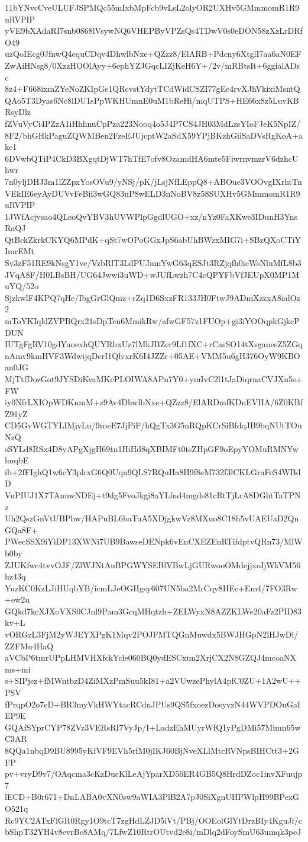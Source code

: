 11bYNvcCveULUFJSPMQc55mIxbMpFcb9vLsL2olyOR2UXHv5GMmmomR1R9uRVPIP
yVE9bXAdaRI7snb0868lVsywNQ6VHEPByVPZsQs4TDwV0s0eDON58zXzLrDRfO49
uzQoIEcg0JfnwQ4equCDqv4DhwlbNxe+QZzz8/ElARB+Pdcny6XtglI7aa6aN0EF
ZwAiHNsg8/0XzzHOOlAyy+6ephYZJGqcLIZjKeH6Y+/2v/mRBtsIt+6ggialADsc
8z4+F668ixmZYeNoZKIpGe1QRcvstYdytTCdWidCSZI77gEe4rvXJhVkixiMsntQ
QAo5T3Dyas6Nc8lDU1sPpWKHUmnE0uM1bReHi/mqUTPS+HE66x8z5LuvKBRsyDlz
fZVuVyCi4PZzA1iHhhnuCpPza223Nooq4o5J4P7CS4JH03MdLzsYIoFJeK5NpIZ/
8F2/bhGHkPaguZQWMBen2FzeEJUjcptW2aSdX59YPjBKzhGiiSaDVsRgKoA+akc1
6DVwbQTiP4CkD3BXgqtDjWT7hTfE7ofv8OzamdHA6mte5FiwrnvmzrV6dzhcUhwr
7n0yljDHJ3m1lZZpxYosOVu9/yNSj/pK/jLsjNfLEppQ8+ABOue3VOOvgIXrhtTn
VEkIE6eyAyDUVvFeBii3wGQ83uP8wELD3nNoBV8z58SUXHv5GMmmomR1R9uRVPIP
1JWfAcjysao4QLeoQvYBV3hUVWPlpGgdlUGO+xz/nYz0FaXKwe3IDunH3YnsRaQJ
QtBckZkrkCKYQ6MPdK+qSt7wOPoGGxJpS6abUhBWzxMIG7i+SBzQXoCTiYImrEMt
Sv3zF51RE9kNsgY1ve/VzbRlT3LdPUJmnYwG63qESJt3RZjqfh0icWsNluMfL8b3
JVqA8F/H0LBsBH/UG64Jwwi3uWD+wJUfLwzh7C4cQPYFbVfJEUpX0MP1MuYQ/52o
SjzkwlF4KPQ7qHc/IbgGrGlQmz+rZq1D6SxzFR133JH0FtwJ9ADmXzzxA8ialOz2
mToYKIqldZVPBQrx21sDpTen6MmikRw/afwGF57z1FUOp+gi3iYOOqpkGjkcPDUN
IUTgFgRV10gdYuoexhQUYRhxUz7lMkJBZer9Lf1fXC+rCasSO14tXsganesZ5ZGq
nAmv9kmHVF3WdwijqDcrI1QlvxrK6I4JZZr+05AE+VMM5u6gH376OyW9KBOan0JG
MjTtfDozGot9JYSDiKvaMKcPLOIWA8APn7Y0+ymIvC2l1tJaDiqruaCVJXn5s+FW
iy0NfrLXIOpWDKnmM+z9Av4DhwlbNxe+QZzz8/ElARDmfKDnEVHA/6Z0KBfZ91yZ
CD5GvWGTYLIMjvLu/9roeE7JjPiF/hQgTx3G5nRQpKCrSiBfdqJB9bqNUtTOuNzQ
sSYLd8RSx4D8yAPgXjgH69tn1HiHd8qXBIMFt0tsZHpGF9oEpyYOMuRMNYwhnqbE
ib+2fFIghQ1w6cY3plrxG6Q0Uqn9QLS7RQuHa8H9f8eM732f3lCKLGraFeS4WBdD
VuPIUJ1X7TAnnwNDEj+t9dg5FvoJkgi8aYLfnd4mgds81cRtTjLrA8DGhtTaTPNz
Uh2QszGnVtUBPbw/HAPuBL6baTuA5XDjgkwVz8MXuo8C18h5vUAEUaD2QnGQa8F+
PWecSSX9iYiDP13XWNi7UB9BawseDENpk6vEnCXEZEnRTifdptvQRn73/MlWb0by
ZJUKfwc4tvvOJF/ZlWJNtAuBPGWYSEBlVBwLjGURwooOMdejjxoIjWkVM56hz43q
YuzKC0KzLJiHUqbYB/icmLJeOGHgsy607UN5ba2MrCqy8HEc+Em4/7FO3Rw+ew2u
GQkd7kcXJXoVXS0CJnl9Pam3GcqMHqtzh+ZELWyxN8AZZKLWe20aFz2PID83kv+L
vORGzL3FjM2yWJEYXPgK1Mqv2POJFMTQGnMuwdx5BWJHGpN2lHJwDi/ZZFMu4HaQ
aVCbP6tmrUPpLHMVHXfckYcle060BQ0ydESCxun2XrjCX2N8GZQJ4mcoaNXms+mi
s+SIPjez+fMWntbzD4ZiMXzPmSuu5kI81+a2VUwzePhylA4pfC0ZU+1A2wU++PSV
fPrqpO2o7eD+BR3myVkHWYtacRCdnJPUs9QS5fxoezDosyvzN44WVPDOuGaIEP9E
GQAfSYprCYP78ZVz3VERsRI7VyJp/I+LadzEhMUyrWfQ1yPgDMi57Mimn65wC3AR
8QQa1nbqD9BU8995yKfVF9EVh5rfM0jIKJ60BjNveXLlMtcRVNpsBIHCtt3+2GFP
pv+vryD9v7/OAqcma3cKzDucKlLeAjYparXD56ER4GB5Q8HrdDZoc1invXFuujp7
lECD+B0r671+DnLABA0vXN0sw9aWIA3PlB2A7pJ0SiXgnUHPWlpH99BPexGO521q
Rc9YC2ATxFlGR0Rgy1O9tcT7zgHdLZJD5iVt/PBj/OOEolGlYtDrzBIy4KguJf/c
bShpT32YH4v8evrBc8AMq/7LfwZ10RtrOUtvd2e8i/mDlq2dFoySmU63umqk3peJ
